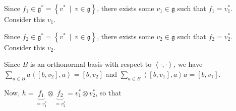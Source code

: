 \documentclass[etingof-lie.tex]{subfiles}
\begin{document}
Since $f_{1}\in\mathfrak{g}^{\ast}=\left\{  v^{\ast}\ \mid\ v\in
\mathfrak{g}\right\}  $, there exists some $v_{1}\in\mathfrak{g}$ such that
$f_{1}=v_{1}^{\ast}$. Consider this $v_{1}$.

Since $f_{2}\in\mathfrak{g}^{\ast}=\left\{  v^{\ast}\ \mid\ v\in
\mathfrak{g}\right\}  $, there exists some $v_{2}\in\mathfrak{g}$ such that
$f_{2}=v_{2}^{\ast}$. Consider this $v_{2}$.

Since $B$ is an orthonormal basis with respect to $\left\langle \cdot
,\cdot\right\rangle $, we have $\sum\limits_{a\in B}a\left\langle \left[
b,v_{2}\right]  ,a\right\rangle =\left[  b,v_{2}\right]  $ and $\sum
\limits_{a\in B}\left\langle \left[  b,v_{1}\right]  ,a\right\rangle a=\left[
b,v_{1}\right]  $.

Now, $h=\underbrace{f_{1}}_{=v_{1}^{\ast}}\otimes\underbrace{f_{2}}%
_{=v_{2}^{\ast}}=v_{1}^{\ast}\otimes v_{2}^{\ast}$, so that%
\end{document}
